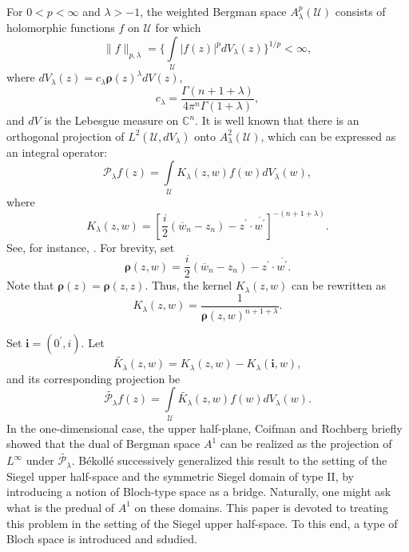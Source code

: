 \documentclass{amsart}
\numberwithin{equation}{section}
\newcommand{\calU}{\mathcal{U}}
\newcommand{\bfi}{\mathbf{i}}
\newcommand{\bfrho}{\boldsymbol{\rho}}
\begin{document}
For $0<p<\infty$ and $\lambda>-1$, the weighted Bergman space $A_{\lambda}^p(\calU)$ consists of holomorphic functions $f$ on $\calU$ for which
\begin{equation*}
\|f\|_{p,\lambda}=\bigg\{\int\limits_{\calU} |f(z)|^p dV_{\lambda}(z)\bigg\}^{1/p}<\infty,
\end{equation*}
where $dV_{\lambda}(z)=c_{\lambda} \bfrho(z)^{\lambda} dV(z)$,
\[
 c_{\lambda} =\frac{\Gamma(n+1+\lambda)}{4\pi^n \Gamma(1+\lambda)},
\]
 and $dV$ is the Lebesgue measure on $\mathbb{C}^n$.
It is well known that there is an orthogonal projection of $L^2(\calU,dV_{\lambda})$ onto $A_{\lambda}^2(\calU)$, which can be expressed as an integral operator:
\[
\mathcal{P}_{\lambda}f(z) =  \int\limits_{\calU} K_{\lambda}(z,w) f(w) dV_{\lambda}(w),
\]
where
\[
K_{\lambda}(z,w)=\left[ \frac{i}{2}(\overline{w}_n-z_n)-z^{\prime} \cdot \overline{w^{\prime}} \right]^{-(n+1+\lambda)}.
\]
See, for instance, \cite[Theorem 5.1]{Gin64}.
For brevity, set
\[
\bfrho(z,w)=\frac{i}{2}(\overline{w}_n-z_n)-z^{\prime} \cdot \overline{w^{\prime}}.
\]
Note that $\bfrho(z)=\bfrho(z,z)$. Thus, the kernel $K_{\lambda}(z,w)$ can be rewritten as
\[
K_{\lambda}(z,w)=\frac {1}{\bfrho(z,w)^{n+1+\lambda}}.
\]


Set $\bfi=(0^{\prime},i)$. Let
\[
\widetilde{K_{\lambda}}(z,w) = K_{\lambda}(z,w)-K_{\lambda}(\bfi, w),
\]
and its corresponding projection be
\[
\widetilde{\mathcal{P}_{\lambda}} f(z)= \int\limits_{\calU} \widetilde{K_{\lambda}} (z,w) f(w) dV_\lambda(w).
\]
In the one-dimensional case, the upper half-plane, Coifman and Rochberg \cite{CR80} briefly showed that the dual of Bergman space $A^1$ can be realized as the projection of $L^{\infty}$ under $\widetilde{\mathcal{P}_{\lambda}}$. B\'ekoll\'e \cite{Bek83,Bek86} successively generalized this result to the setting of the Siegel upper half-space and the symmetric Siegel domain of type II, 
by introducing a notion of Bloch-type space as a bridge. Naturally, one might ask what is the predual of $A^1$ on these domains.
This paper is devoted to treating this problem in the setting of the Siegel upper half-space.
To this end,  a type of Bloch space is introduced and sdudied. 
\end{document}
